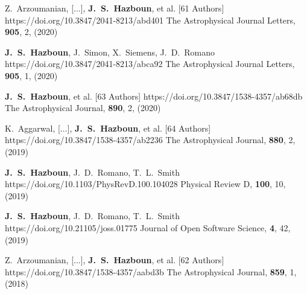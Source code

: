          {Z.~{Arzoumanian}, [...], \textbf{J.~S.~{Hazboun}}, et al. [61 Authors]}
         {https://doi.org/10.3847/2041-8213/abd401}
         {{The Astrophysical Journal Letters}, \textbf{905}, 2, (2020)}

         {\textbf{J.~S.~Hazboun}, J.~{Simon}, X.~{Siemens}, J.~D.~{Romano}}
         {https://doi.org/10.3847/2041-8213/abca92}
         {{The Astrophysical Journal Letters}, \textbf{905}, 1, (2020)}

         {\textbf{J.~S.~{Hazboun}}, et al. [63 Authors]}
         {https://doi.org/10.3847/1538-4357/ab68db}
         {{The Astrophysical Journal}, \textbf{890}, 2, (2020)}

         {K.~{Aggarwal}, [...], \textbf{J.~S.~{Hazboun}}, et al. [64 Authors]}
         {https://doi.org/10.3847/1538-4357/ab2236}
         {{The Astrophysical Journal}, \textbf{880}, 2, (2019)}

         {\textbf{J.~S.~Hazboun}, J.~D.~{Romano}, T.~L.~{Smith}}
         {https://doi.org/10.1103/PhysRevD.100.104028}
         {{Physical Review D}, \textbf{100}, 10, (2019)}

         {\textbf{J.~S.~Hazboun}, J.~D.~{Romano}, T.~L.~{Smith}}
         {https://doi.org/10.21105/joss.01775}
         {{Journal of Open Software Science}, \textbf{4}, 42, (2019)}

         {Z.~{Arzoumanian}, [...], \textbf{J.~S.~{Hazboun}}, et al. [62 Authors]}
         {https://doi.org/10.3847/1538-4357/aabd3b}
         {{The Astrophysical Journal}, \textbf{859}, 1, (2018)}

